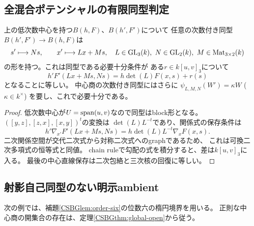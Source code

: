 \subsection{全混合ポテンシャルの有限同型判定}
\begin{proposition}[中心blockと三次ポテンシャルの共変性]
\label{prop:moduli-mixed-block-isomorphism}
上の低次数中心を持つ$B(h,F)$、$B(h',F')$について
任意の次数付き同型$B(h',F')\to B(h,F)$は
\[
 s' \longmapsto Ns,\qquad x'\longmapsto Lx+Ms,
 \quad
 L\in\mathrm{GL}_3(k),\ N\in\mathrm{GL}_2(k),\ M\in\mathrm{Mat}_{3\times2}(k)
\]
の形を持つ。これは同型である必要十分条件が
ある$r\in k[u,v]_3$について
\[
 h'F'(Lx+Ms,Ns)=h\det(L)F(x,s)+r(s)
\]
となることに等しい。
中心商の次数付き同型にはさらに
$\psi_{L,M,N}(W')=\kappa W$ ($\kappa\in k^\times$)
を要し、これで必要十分である。
\end{proposition}
\begin{proof}
低次数中心が$U=\operatorname{span}(u,v)$なので同型はblock形となる。
$([y,z],[z,x],[x,y])^t$の変換は
$\det(L)L^{-t}$であり、関係式の保存条件は
\[
 h'\nabla_{x'}F'(Lx+Ms,Ns)
 =h\det(L)L^{-t}\nabla_xF(x,s).
\]
二次関係空間が交代二次式から対称二次式へのgraphであるため、
これは可換二次多項式の恒等式と同値。
chain ruleで勾配の式を積分すると、差は$k[u,v]_3$に入る。
最後の中心直線保存は二次包絡と三次核の回復に等しい。
\end{proof}

\subsection{射影自己同型のない明示ambient}
次の例では、補題\ref{CSBGlem:order-six}の位数六の楕円境界を用いる。
正則な中心商の開集合の存在は、定理\ref{CSBGthm:global-open}から従う。

